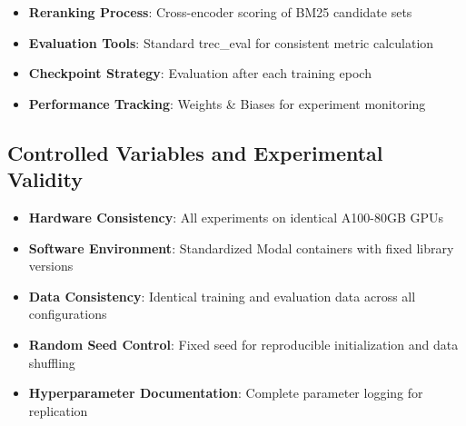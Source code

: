 \begin{itemize}
    \item \textbf{Reranking Process}: Cross-encoder scoring of BM25 candidate sets
    \item \textbf{Evaluation Tools}: Standard trec\_eval for consistent metric calculation
    \item \textbf{Checkpoint Strategy}: Evaluation after each training epoch
    \item \textbf{Performance Tracking}: Weights \& Biases for experiment monitoring
\end{itemize}

\subsection{Controlled Variables and Experimental Validity}

\begin{itemize}
    \item \textbf{Hardware Consistency}: All experiments on identical A100-80GB GPUs
    \item \textbf{Software Environment}: Standardized Modal containers with fixed library versions
    \item \textbf{Data Consistency}: Identical training and evaluation data across all configurations
    \item \textbf{Random Seed Control}: Fixed seed for reproducible initialization and data shuffling
    \item \textbf{Hyperparameter Documentation}: Complete parameter logging for replication
\end{itemize}


